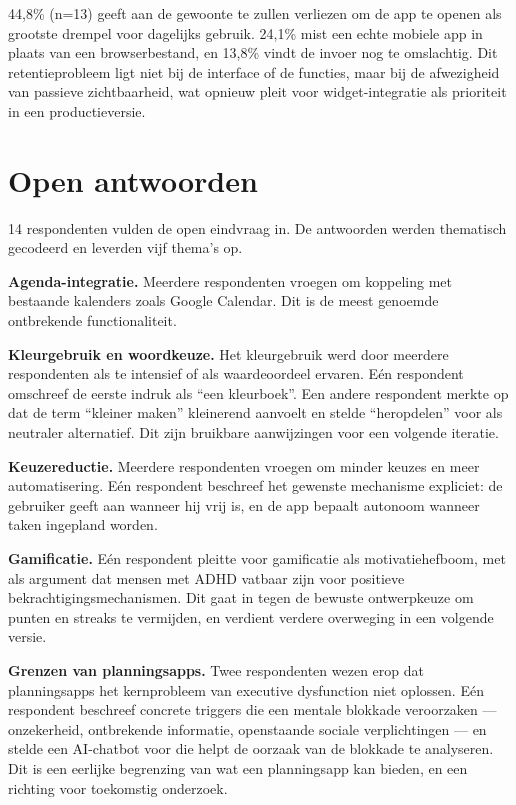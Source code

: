 44,8\% (n=13) geeft aan de gewoonte te zullen verliezen om de app te openen als
grootste drempel voor dagelijks gebruik. 24,1\% mist een echte mobiele app in
plaats van een browserbestand, en 13,8\% vindt de invoer nog te omslachtig.
Dit retentieprobleem ligt niet bij de interface of de functies, maar bij de
afwezigheid van passieve zichtbaarheid, wat opnieuw pleit voor
widget-integratie als prioriteit in een productieversie.

\section{Open antwoorden}

14 respondenten vulden de open eindvraag in. De antwoorden werden thematisch
gecodeerd en leverden vijf thema's op.

\textbf{Agenda-integratie.} Meerdere respondenten vroegen om koppeling met
bestaande kalenders zoals Google Calendar. Dit is de meest genoemde ontbrekende
functionaliteit.

\textbf{Kleurgebruik en woordkeuze.} Het kleurgebruik werd door meerdere
respondenten als te intensief of als waardeoordeel ervaren. Eén respondent
omschreef de eerste indruk als ``een kleurboek''. Een andere respondent merkte
op dat de term ``kleiner maken'' kleinerend aanvoelt en stelde ``heropdelen''
voor als neutraler alternatief. Dit zijn bruikbare aanwijzingen voor een volgende
iteratie.

\textbf{Keuzereductie.} Meerdere respondenten vroegen om minder keuzes en
meer automatisering. Eén respondent beschreef het gewenste mechanisme expliciet:
de gebruiker geeft aan wanneer hij vrij is, en de app bepaalt autonoom wanneer
taken ingepland worden.

\textbf{Gamificatie.} Eén respondent pleitte voor gamificatie als
motivatiehefboom, met als argument dat mensen met ADHD vatbaar zijn voor
positieve bekrachtigingsmechanismen. Dit gaat in tegen de bewuste ontwerpkeuze
om punten en streaks te vermijden, en verdient verdere overweging in een
volgende versie.

\textbf{Grenzen van planningsapps.} Twee respondenten wezen erop dat
planningsapps het kernprobleem van executive dysfunction niet oplossen. Eén
respondent beschreef concrete triggers die een mentale blokkade veroorzaken —
onzekerheid, ontbrekende informatie, openstaande sociale verplichtingen — en
stelde een AI-chatbot voor die helpt de oorzaak van de blokkade te analyseren.
Dit is een eerlijke begrenzing van wat een planningsapp kan bieden, en een
richting voor toekomstig onderzoek.

